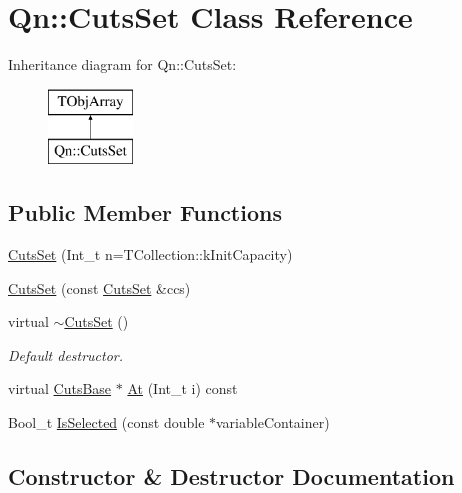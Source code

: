\hypertarget{classQn_1_1CutsSet}{}\section{Qn\+:\+:Cuts\+Set Class Reference}
\label{classQn_1_1CutsSet}
Inheritance diagram for Qn\+:\+:Cuts\+Set\+:\begin{figure}[H]
\begin{center}
\leavevmode
\includegraphics[height=2.000000cm]{classQn_1_1CutsSet}
\end{center}
\end{figure}
\subsection*{Public Member Functions}
\begin{DoxyCompactItemize}
\item 
\mbox{\hyperlink{classQn_1_1CutsSet_abb692440b7ffadcf3a0b5881fc1906c8}{Cuts\+Set}} (Int\+\_\+t n=T\+Collection\+::k\+Init\+Capacity)
\item 
\mbox{\hyperlink{classQn_1_1CutsSet_ac8b055e82b9f8dbb70c427525543a6a2}{Cuts\+Set}} (const \mbox{\hyperlink{classQn_1_1CutsSet}{Cuts\+Set}} \&ccs)
\item 
\mbox{\label{classQn_1_1CutsSet_ad10fa23d0dc5e73f22d067111be6ed76}} 
virtual \mbox{\hyperlink{classQn_1_1CutsSet_ad10fa23d0dc5e73f22d067111be6ed76}{$\sim$\+Cuts\+Set}} ()
\begin{DoxyCompactList}\small\item\em Default destructor. \end{DoxyCompactList}\item 
virtual \mbox{\hyperlink{classQn_1_1CutsBase}{Cuts\+Base}} $\ast$ \mbox{\hyperlink{classQn_1_1CutsSet_a2f572076ba27d9031975fc38dc160d12}{At}} (Int\+\_\+t i) const
\item 
Bool\+\_\+t \mbox{\hyperlink{classQn_1_1CutsSet_a69dc9eba4cdb1e1270bb9340212f20b7}{Is\+Selected}} (const double $\ast$variable\+Container)
\end{DoxyCompactItemize}


\subsection{Constructor \& Destructor Documentation}
\mbox{\label{classQn_1_1CutsSet_abb692440b7ffadcf3a0b5881fc1906c8}} 
